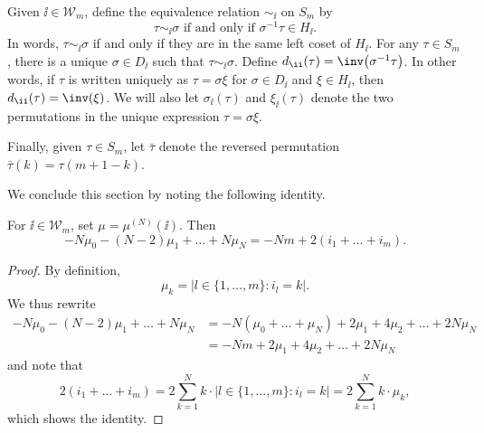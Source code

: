Given $\ii \in \mathcal{W}_m$, define the equivalence relation $\sim_{\ii}$ on $S_m$ by
\[
\tau \sim_{\ii} \sigma \text{ if and only if } \sigma^{-1}\tau \in H_{\ii}.
\]
In words, $\tau \sim_{\ii} \sigma$ if and only if they are in the same left coset of $H_{\ii}$. For any $\tau \in S_m$, there is a unique $\sigma \in D_{\ii}$ such that $\tau \sim_{\ii} \sigma$. Define $d_{\ii}(\tau)= \inv\big(\sigma^{-1}\tau\big)$. In other words, if $\tau$ is written uniquely as $\tau=\sigma \xi$ for $\sigma \in D_{\ii}$ and $\xi \in H_{\ii}$, then $d_{\ii}(\tau) = \inv(\xi)$. We will also let $\sigma_{\ii}(\tau)$ and $\xi_{\ii}(\tau)$ denote the two permutations in the unique expression $\tau = \sigma \xi$.

Finally, given $\tau \in S_m$, let $\bar{\tau}$ denote the reversed permutation $\bar{\tau}(k)= \tau(m+1-k)$.

We conclude this section by noting the following identity.
\begin{Lemma}\label{Leem}
For $\ii \in \mathcal{W}_m$, set $\mu = \mu^{(N)}(\ii)$. Then
\[
-N\mu_{0} -(N-2)\mu_{1} + \dots + N\mu_{N} = -Nm + 2(i_1+ \dots + i_m).
\]
\end{Lemma}
\begin{proof}
By definition,
\[
\mu_k = | l \in \{1,\dots,m\}\colon i_l=k |.
\]
We thus rewrite
\begin{align*}
-N\mu_{0} -(N-2)\mu_{1} + \dots + N\mu_{N} &= -N(\mu_0 + \dots + \mu_N) + 2\mu_1 + 4\mu_2 + \dots + 2N\mu_N \\
&= -Nm+ 2\mu_1 + 4\mu_2 + \dots + 2N\mu_N
\end{align*}
and note that
\[
2(i_1 + \dots + i_m) = 2\sum_{k=1}^N k\cdot | l \in \{1,\dots,m\}\colon i_l=k | = 2\sum_{k=1}^N k\cdot \mu_k,
\]
which shows the identity.
\end{proof}

